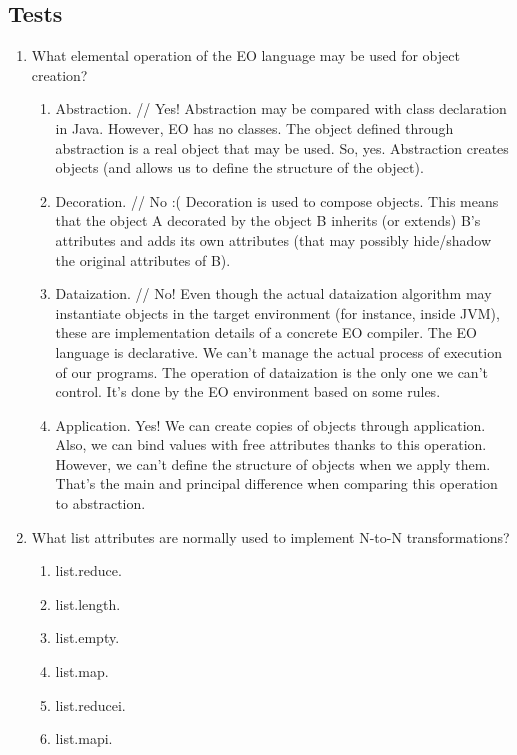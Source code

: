 \documentclass[12pt]{book}
\begin{document}
\subsection{Tests}
\begin{enumerate}
    \item What elemental operation of the EO language may be used for object creation?
    \begin{enumerate}
        \item Abstraction. // Yes! Abstraction may be compared with class declaration in Java. However, EO has no classes. The object defined through abstraction is a real object that may be used. So, yes. Abstraction creates objects (and allows us to define the structure of the object). 
        \item Decoration. // No :( Decoration is used to compose objects. This means that the object A decorated by the object B inherits (or extends) B’s attributes and adds its own attributes (that may possibly hide/shadow the original attributes of B). 
        \item Dataization. // No! Even though the actual dataization algorithm may instantiate objects in the target environment (for instance, inside JVM), these are implementation details of a concrete EO compiler. The EO language is declarative. We can’t manage the actual process of execution of our programs. The operation of dataization is the only one we can’t control. It’s done by the EO environment based on some rules. 
        \item Application. Yes! We can create copies of objects through application. Also, we can bind values with free attributes thanks to this operation. However, we can’t define the structure of objects when we apply them. That’s the main and principal difference when comparing this operation to abstraction. 
    \end{enumerate}
    
    \item What list attributes are normally used to implement N-to-N transformations?
    \begin{enumerate}
        \item list.reduce.
        \item list.length.
        \item list.empty.
        \item list.map.
        \item list.reducei.
        \item list.mapi.
    \end{enumerate}
    

\end{enumerate}
\end{document}
